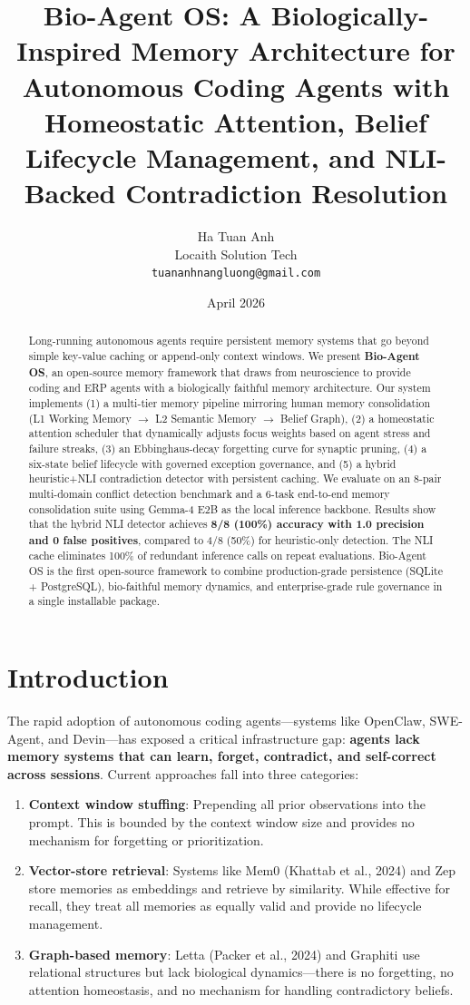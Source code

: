 \documentclass[authoryear]{article}
\title{Bio-Agent OS: A Biologically-Inspired Memory Architecture for Autonomous Coding Agents with Homeostatic Attention, Belief Lifecycle Management, and NLI-Backed Contradiction Resolution}
\author{Ha Tuan Anh \\ Locaith Solution Tech \\ \texttt{tuananhnangluong@gmail.com}}
\date{April 2026}
\begin{document}
\maketitle

\begin{abstract}
Long-running autonomous agents require persistent memory systems that go beyond simple key-value caching or append-only context windows. We present \textbf{Bio-Agent OS}, an open-source memory framework that draws from neuroscience to provide coding and ERP agents with a biologically faithful memory architecture. Our system implements (1) a multi-tier memory pipeline mirroring human memory consolidation (L1 Working Memory $\rightarrow$ L2 Semantic Memory $\rightarrow$ Belief Graph), (2) a homeostatic attention scheduler that dynamically adjusts focus weights based on agent stress and failure streaks, (3) an Ebbinghaus-decay forgetting curve for synaptic pruning, (4) a six-state belief lifecycle with governed exception governance, and (5) a hybrid heuristic+NLI contradiction detector with persistent caching. We evaluate on an 8-pair multi-domain conflict detection benchmark and a 6-task end-to-end memory consolidation suite using Gemma-4 E2B as the local inference backbone. Results show that the hybrid NLI detector achieves \textbf{8/8 (100\%) accuracy with 1.0 precision and 0 false positives}, compared to 4/8 (50\%) for heuristic-only detection. The NLI cache eliminates 100\% of redundant inference calls on repeat evaluations. Bio-Agent OS is the first open-source framework to combine production-grade persistence (SQLite + PostgreSQL), bio-faithful memory dynamics, and enterprise-grade rule governance in a single installable package.
\end{abstract}

\section{Introduction}

The rapid adoption of autonomous coding agents—systems like OpenClaw, SWE-Agent, and Devin—has exposed a critical infrastructure gap: \textbf{agents lack memory systems that can learn, forget, contradict, and self-correct across sessions}. Current approaches fall into three categories:

\begin{enumerate}
    \item \textbf{Context window stuffing}: Prepending all prior observations into the prompt. This is bounded by the context window size and provides no mechanism for forgetting or prioritization.
    \item \textbf{Vector-store retrieval}: Systems like Mem0 (Khattab et al., 2024) and Zep store memories as embeddings and retrieve by similarity. While effective for recall, they treat all memories as equally valid and provide no lifecycle management.
    \item \textbf{Graph-based memory}: Letta (Packer et al., 2024) and Graphiti use relational structures but lack biological dynamics—there is no forgetting, no attention homeostasis, and no mechanism for handling contradictory beliefs.
\end{enumerate}
\end{document}
